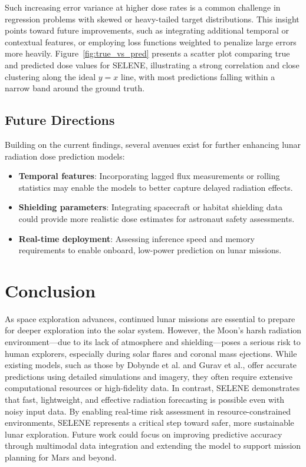 \documentclass[conference]{IEEEtran}
\begin{document}
Such increasing error variance at higher dose rates is a common challenge in regression problems with skewed or heavy-tailed target distributions. This insight points toward future improvements, such as integrating additional temporal or contextual features, or employing loss functions weighted to penalize large errors more heavily.
Figure~\ref{fig:true_vs_pred} presents a scatter plot comparing true and predicted dose values for SELENE, illustrating a strong correlation and close clustering along the ideal $y = x$ line, with most predictions falling within a narrow band around the ground truth.



\subsection{Future Directions}

Building on the current findings, several avenues exist for further enhancing lunar radiation dose prediction models:

\begin{itemize}
    \item \textbf{Temporal features}: Incorporating lagged flux measurements or rolling statistics may enable the models to better capture delayed radiation effects.
    \item \textbf{Shielding parameters}: Integrating spacecraft or habitat shielding data could provide more realistic dose estimates for astronaut safety assessments.
    \item \textbf{Real-time deployment}: Assessing inference speed and memory requirements to enable onboard, low-power prediction on lunar missions.
\end{itemize}


\section{Conclusion}

As space exploration advances, continued lunar missions are essential to prepare for deeper exploration into the solar system. However, the Moon’s harsh radiation environment—due to its lack of atmosphere and shielding—poses a serious risk to human explorers, especially during solar flares and coronal mass ejections. While existing models, such as those by Dobynde et al.\cite{2022cosp...44.2697D} and Gurav et al.\cite{Zampieri2024}, offer accurate predictions using detailed simulations and imagery, they often require extensive computational resources or high-fidelity data. In contrast, SELENE demonstrates that fast, lightweight, and effective radiation forecasting is possible even with noisy input data. By enabling real-time risk assessment in resource-constrained environments, SELENE represents a critical step toward safer, more sustainable lunar exploration. Future work could focus on improving predictive accuracy through multimodal data integration and extending the model to support mission planning for Mars and beyond.



\end{document}
